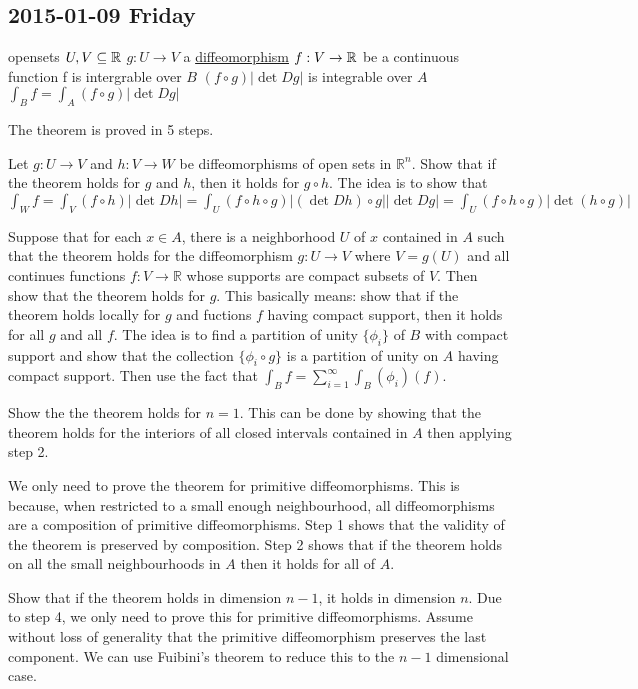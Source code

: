 
\subsection{2015-01-09 Friday}

 
\begin{tTheorem}
\tLET
opensets $U, V \subseteq {\mathbb R}$\newline
$g: U\to V$ a \hyperref[kw:diffeomorphism]{diffeomorphism}\newline
$f:V\to {\mathbb R}$ be a continuous function
\tTHEN f is intergrable over $B$\newline
  \IFF $(f\circ g)|\det D g|$ is integrable over $A$
\tNOTE $\int_B f = \int_A(f\circ g)|\det D g|$
\end{tTheorem}
\IDEA The theorem is proved in 5 steps.

\begin{myenumerate}
\item Let $g: U \to V$ and $h: V \to W$ be diffeomorphisms of open sets in $\mathbb{R}^n$. Show that if the theorem holds for $g$ and $h$, then it holds for $g \circ h$. The idea is to show that $\int_W f = \int_V (f \circ h)|\det Dh| = \int_U (f \circ h \circ g)|(\det Dh) \circ g| |\det Dg| = \int_U (f \circ h \circ g)|\det (h \circ g)|$
\item Suppose that for each $x \in A$, there is a neighborhood $U$ of $x$ contained in $A$ such that the theorem holds for the diffeomorphism $g: U \to V$ where $V = g(U)$ and all continues functions $f: V \to \mathbb{R}$ whose supports are compact subsets of $V$. Then show that the theorem holds for $g$. This basically means: show that if the theorem holds locally for $g$ and fuctions $f$ having compact support, then it holds for all $g$ and all $f$. The idea is to find a partition of unity $\{\phi_i\}$ of $B$ with compact support and show that the collection $\{\phi_i \circ g\}$ is a partition of unity on $A$ having compact support. Then use the fact that $\int_B f = \sum_{i = 1}^{\infty} \int_B (\phi_i)(f)$.
\item Show the the theorem holds for $n = 1$. This can be done by showing that the theorem holds for the interiors of all closed intervals contained in $A$ then applying step 2.
\item We only need to prove the theorem for primitive diffeomorphisms. This is because, when restricted to a small enough neighbourhood, all diffeomorphisms are a composition of primitive diffeomorphisms. Step 1 shows that the validity of the theorem is preserved by composition. Step 2 shows that if the theorem holds on all the small neighbourhoods in $A$ then it holds for all of $A$.
\item Show that if the theorem holds in dimension $n-1$, it holds in dimension $n$. Due to step 4, we only need to prove this for primitive diffeomorphisms. Assume without loss of generality that the primitive diffeomorphism preserves the last component. We can use Fuibini's theorem to reduce this to the $n-1$ dimensional case.
\end{myenumerate}



